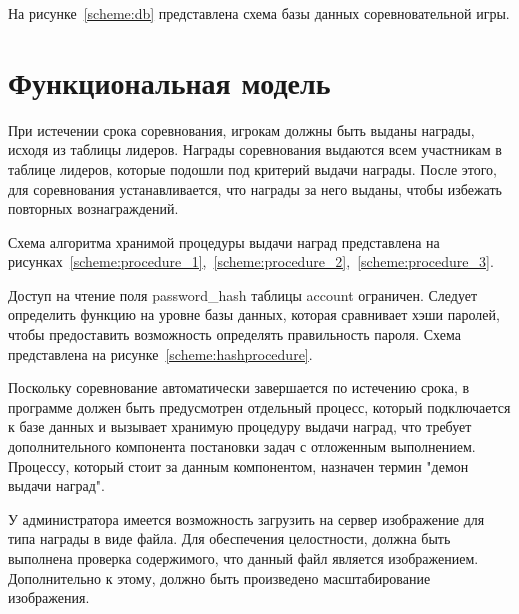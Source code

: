 \FloatBarrier

На рисунке~\ref{scheme:db} представлена схема базы данных соревновательной игры.


\section{Функциональная модель}
При истечении срока соревнования, игрокам должны быть выданы награды, исходя из таблицы лидеров. Награды соревнования выдаются всем участникам в таблице лидеров, которые подошли под критерий выдачи награды. После этого, для соревнования устанавливается, что награды за него выданы, чтобы избежать повторных вознаграждений.

Схема алгоритма хранимой процедуры выдачи наград представлена на рисунках~\ref{scheme:procedure_1},~\ref{scheme:procedure_2},~\ref{scheme:procedure_3}.

Доступ на чтение поля password\_hash таблицы account ограничен. Следует определить функцию на уровне базы данных, которая сравнивает хэши паролей, чтобы предоставить возможность определять правильность пароля. Схема представлена на рисунке~\ref{scheme:hashprocedure}.


Поскольку соревнование автоматически завершается по истечению срока, в программе должен быть предусмотрен отдельный процесс, который подключается к базе данных и вызывает хранимую процедуру выдачи наград, что требует дополнительного компонента постановки задач с отложенным выполнением. Процессу, который стоит за данным компонентом, назначен термин "демон выдачи наград".

У администратора имеется возможность загрузить на сервер изображение для типа награды в виде файла. Для обеспечения целостности, должна быть выполнена проверка содержимого, что данный файл является изображением. Дополнительно к этому, должно быть произведено масштабирование изображения.

